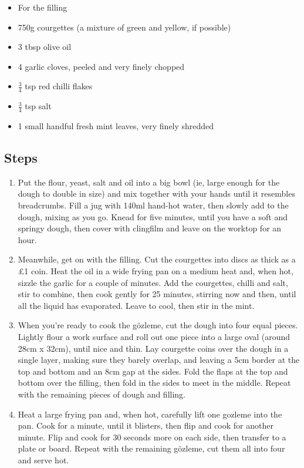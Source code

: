 \documentclass{book}
\begin{document}
\begin{itemize}
\item For the filling 
\item 750g courgettes (a mixture of green and yellow, if possible)
\item 3 tbsp olive oil 
\item 4 garlic cloves, peeled and very finely chopped
\item $\frac{3}{4}$ tsp red chilli flakes 
\item $\frac{3}{4}$ tsp salt 
\item 1 small handful fresh mint leaves, very finely shredded 
\end{itemize}

\subsection*{Steps}
\begin{enumerate}
\item Put the flour, yeast, salt and oil into a big bowl (ie, large enough for the dough to double in size) and mix together with your hands until it resembles breadcrumbs. Fill a jug with 140ml hand-hot water, then slowly add to the dough, mixing as you go. Knead for five minutes, until you have a soft and springy dough, then cover with clingfilm and leave on the worktop for an hour.
\item Meanwhile, get on with the filling. Cut the courgettes into discs as thick as a £1 coin. Heat the oil in a wide frying pan on a medium heat and, when hot, sizzle the garlic for a couple of minutes. Add the courgettes, chilli and salt, stir to combine, then cook gently for 25 minutes, stirring now and then, until all the liquid has evaporated. Leave to cool, then stir in the mint.
\item When you’re ready to cook the gözleme, cut the dough into four equal pieces. Lightly flour a work surface and roll out one piece into a large oval (around 28cm x 32cm), until nice and thin. Lay courgette coins over the dough in a single layer, making sure they barely overlap, and leaving a 5cm border at the top and bottom and an 8cm gap at the sides. Fold the flaps at the top and bottom over the filling, then fold in the sides to meet in the middle. Repeat with the remaining pieces of dough and filling.
\item Heat a large frying pan and, when hot, carefully lift one gozleme into the pan. Cook for a minute, until it blisters, then flip and cook for another minute. Flip and cook for 30 seconds more on each side, then transfer to a plate or board. Repeat with the remaining gözleme, cut them all into four and serve hot.
\end{enumerate}
\newpage
\end{document}
